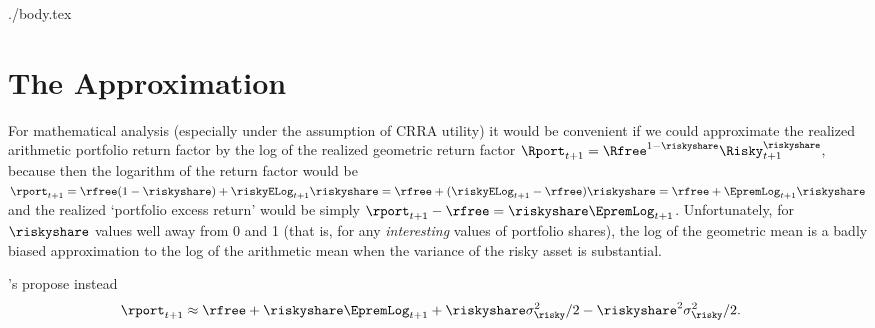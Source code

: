 \documentclass{\handout}
\begin{document}
\begin{verbatimwrite}{./body.tex}


\end{verbatimwrite}


\pagebreak\appendix
\section{The \cite{cvAppendix} Approximation}

For mathematical analysis (especially under the assumption of CRRA
utility) it would be convenient if we could approximate the realized
arithmetic portfolio return factor by the log of the realized geometric return
factor $\Rport_{t+1}=\Rfree^{1-\riskyshare}\Risky_{t+1}^{\riskyshare}$,
because then the logarithm of the return factor would be $\rport_{t+1}
= \rfree (1-\riskyshare)+\riskyELog_{t+1}\riskyshare = \rfree +
(\riskyELog_{t+1}-\rfree)\riskyshare = \rfree + \EpremLog_{t+1} \riskyshare$
and the realized `portfolio excess return' would be simply
$\rport_{t+1}-\rfree = \riskyshare\EpremLog_{t+1}$.  Unfortunately, for
$\riskyshare$ values well away from 0 and 1 (that is, for any {\it
  interesting} values of portfolio shares), the log of the geometric mean is a
badly biased approximation to the log of the arithmetic mean when the variance of
the risky asset is substantial.

\cite{cvAppendix}'s propose instead
\begin{equation}\begin{gathered}\begin{aligned}
  \rport_{t+1} & \approx  \rfree+ \riskyshare \EpremLog_{t+1}+\riskyshare \sigma^{2}_{\risky}/2 - \riskyshare^{2}\sigma^{2}_{\risky}/2 .
\end{aligned}\end{gathered}\end{equation}
\end{document}
